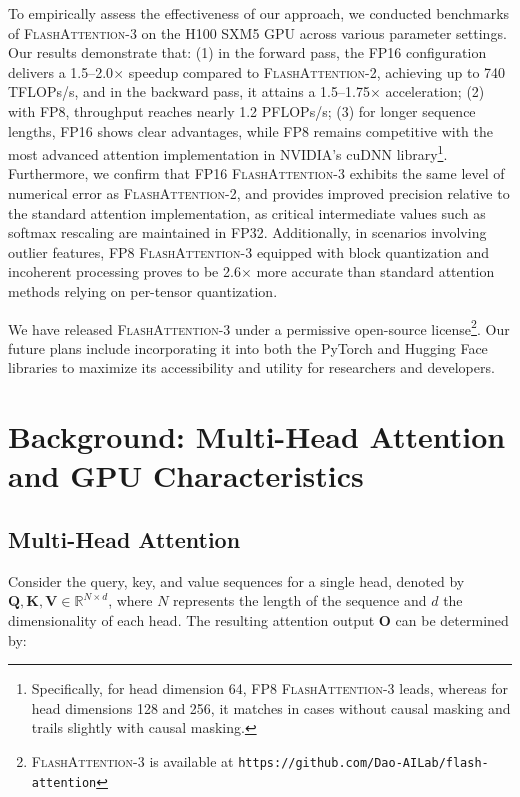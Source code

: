 To empirically assess the effectiveness of our approach, we conducted benchmarks of \textsc{FlashAttention-3} on the H100 SXM5 GPU across various parameter settings. Our results demonstrate that: (1) in the forward pass, the FP16 configuration delivers a 1.5–2.0$\times$ speedup compared to \textsc{FlashAttention-2}, achieving up to 740 TFLOPs/s, and in the backward pass, it attains a 1.5–1.75$\times$ acceleration; (2) with FP8, throughput reaches nearly 1.2 PFLOPs/s; (3) for longer sequence lengths, FP16 shows clear advantages, while FP8 remains competitive with the most advanced attention implementation in NVIDIA's cuDNN library\footnote{Specifically, for head dimension 64, FP8 \textsc{FlashAttention-3} leads, whereas for head dimensions 128 and 256, it matches in cases without causal masking and trails slightly with causal masking.}. Furthermore, we confirm that FP16 \textsc{FlashAttention-3} exhibits the same level of numerical error as \textsc{FlashAttention-2}, and provides improved precision relative to the standard attention implementation, as critical intermediate values such as softmax rescaling are maintained in FP32. Additionally, in scenarios involving outlier features, FP8 \textsc{FlashAttention-3} equipped with block quantization and incoherent processing proves to be 2.6$\times$ more accurate than standard attention methods relying on per-tensor quantization.

We have released \textsc{FlashAttention-3} under a permissive open-source license\footnote{\textsc{FlashAttention-3} is available at \texttt{https://github.com/Dao-AILab/flash-attention}}. Our future plans include incorporating it into both the PyTorch and Hugging Face libraries to maximize its accessibility and utility for researchers and developers.

\section{Background: Multi-Head Attention and GPU Characteristics}
\label{sec:background}

\subsection{Multi-Head Attention}
\label{subsec:multi_head_attn}

Consider the query, key, and value sequences for a single head, denoted by $\mathbf{Q}, \mathbf{K}, \mathbf{V} \in \mathbb{R}^{N \times d}$, where $N$ represents the length of the sequence and $d$ the dimensionality of each head. The resulting attention output $\mathbf{O}$ can be determined by:

